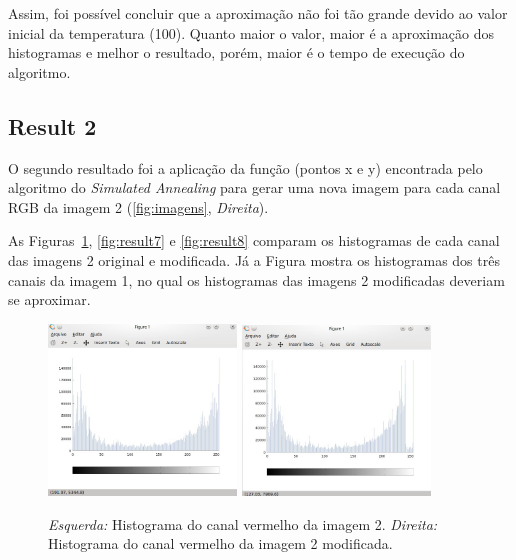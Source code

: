 Assim, foi possível concluir que a aproximação não foi tão grande devido ao valor inicial da temperatura (100). Quanto maior o valor, maior é a aproximação dos histogramas e melhor o resultado, porém, maior é o tempo de execução do algoritmo. 


\subsection{Result 2}

O segundo resultado foi a aplicação da função (pontos x e y) encontrada pelo algoritmo do \textit{Simulated Annealing} para gerar uma nova imagem para cada canal RGB da imagem 2 (\ref{fig:imagens}, \textit{Direita}).

As Figuras~\ref{fig:result6}, \ref{fig:result7} e \ref{fig:result8} comparam os histogramas de cada canal das imagens 2 original e modificada. Já a Figura mostra os histogramas dos três canais da imagem 1, no qual os histogramas das imagens 2 modificadas deveriam se aproximar. 

\begin{figure}[h]
    \centering
    \includegraphics[width=5cm]{HistRed1.jpg}
    \includegraphics[width=5cm]{HistRed2.jpg}
    \caption{\emph{Esquerda:} Histograma do canal vermelho da imagem 2. \emph{Direita:} Histograma do canal vermelho da imagem 2 modificada.}
    \label{fig:result6}
\end{figure}

